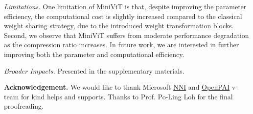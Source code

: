 \documentclass[10pt,twocolumn,letterpaper]{article}
\begin{document}
\noindent
    \textit{Limitations.} One limitation of MiniViT is that, despite improving the parameter efficiency, the computational cost is slightly increased compared to the classical weight sharing strategy, due to the introduced weight transformation blocks. Second, we observe that MiniViT suffers from moderate performance degradation as the compression ratio increases. In future work, we are interested in further improving both the parameter and computational efficiency.

\noindent
    \textit{Broader Impacts.} Presented in the supplementary materials.

\textbf{Acknowledgement.} We would like to thank Microsoft \href{https://github.com/microsoft/nni}{NNI} and \href{https://github.com/microsoft/pai}{OpenPAI} v-team for kind helps and supports. Thanks to Prof. Po-Ling Loh for the final proofreading.

{\small
    
    
    }
    
\end{document}
